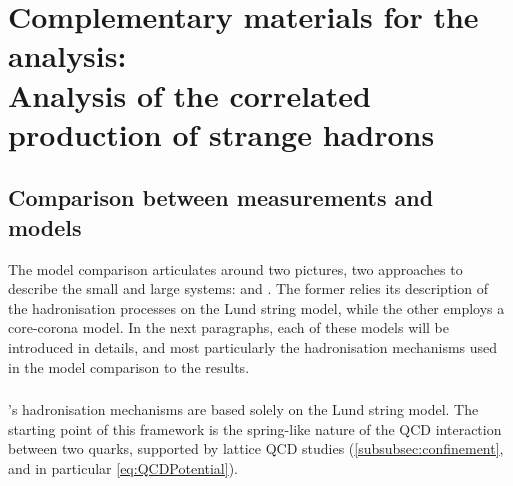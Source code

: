 \chapter{Complementary materials for the analysis:\\Analysis of the correlated production of strange hadrons}
\label{appendix:CorrelatedAnalysis}

\section{Comparison between measurements and models}

The model comparison articulates around two pictures, two approaches to describe the small and large systems: \Pythia and \Epos. The former relies its description of the hadronisation processes on the Lund string model, while the other employs a core-corona model. In the next paragraphs, each of these models will be introduced in details, and most particularly the hadronisation mechanisms used in the model comparison to the results.

\subsection{\Pythia}

\Pythia's hadronisation mechanisms are based solely on the Lund string model. The starting point of this framework is the spring-like nature of the QCD interaction between two quarks, supported by lattice QCD studies (\Sec\ref{subsubsec:confinement}, and in particular \eq\ref{eq:QCDPotential}). 

